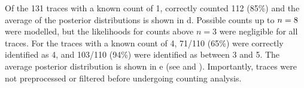
Of the 131 traces with a known count of 1, \ours correctly counted 112 (85\%)
and the average of the posterior distributions is shown in d.
	Possible counts up to $n=8$ were modelled, but the likelihoods for counts above $n=3$ were negligible for all traces.
	For the traces with a known count of 4, 71/110 (65\%) were correctly identified as 4, 
	and 103/110 (94\%) were identified as between 3 and 5. 
	The average posterior distribution is shown in e (see  and ).
	Importantly, traces were not preprocessed or filtered before undergoing \ours counting analysis.
